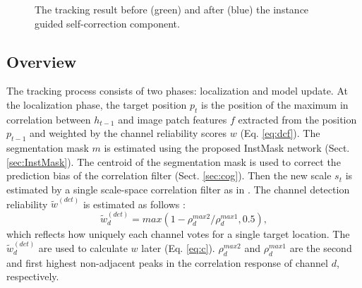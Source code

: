 \begin{figure}
                       \hspace{-0.6em}
                       \hspace{-0.6em}
    \caption{The tracking result before (green) and after (blue) the instance guided self-correction component.}
    \label{fig:IGSC}
\end{figure}

\subsection{Overview}
The tracking process consists of two phases: localization and model update. 
At the localization phase, the target position $p_t$ is the position of the maximum in correlation between $h_{t-1}$ and image patch features $f$ extracted from the position $p_{t-1}$ and weighted by the channel reliability scores $w$ (Eq. \ref{eq:dcf}).
The segmentation mask $m$ is estimated using the proposed InstMask network (Sect. \ref{sec:InstMask}).
The centroid of the segmentation mask is used to correct the prediction bias of the correlation filter (Sect. \ref{sec:cog}).
Then the new scale $s_t$ is estimated by a single scale-space correlation filter as in \cite{Danelljan2014AccurateSE}.
The channel detection reliability $\tilde{w}^{(det)}$ is estimated as follows \cite{Lukezic2017DiscriminativeCF}:
\begin{equation} \label{eq:det}
\tilde w_d^{(det)} = max(1 - \rho_d^{max2} / \rho_d^{max1}, 0.5),
\end{equation}
which reflects how uniquely each channel votes for a single target location. The $\tilde w_d^{(det)}$ are used to calculate $w$ later (Eq. \ref{eq:c}). $\rho_d^{max2}$ and $\rho_d^{max1}$ are the second and first highest non-adjacent peaks in the correlation response of channel $d$, respectively.


